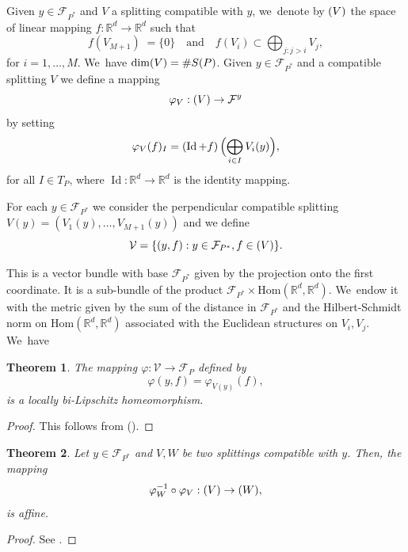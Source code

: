 \documentclass[JEP,XML,SOM,Unicode,NoEqCountersInSection,published]{cedram}
\newcommand{\quand}{\quad\text{and}\quad}
\newcommand{\NoChangel}[1]{%
\expandafter\let\csname old\string#1\endcsname=#1
\let#1=\relax
\newcommand{#1}{\mathop{\mathcode`l="716C\csname old\string#1\endcsname\mathcode`l="7160}\displaylimits}%
}
\newtheorem{theorem}{Theorem}[section]
\newcommand{\R}{\mathbb{R}}
\newcommand{\F}{\mathcal{F}}
\newcommand{\V}{\mathcal{V}}
\DeclareMathOperator{\id}{Id}
\DeclareMathOperator{\nil}{Nil}\NoChangel{\nil}
\begin{document}
Given \(y \in \F_{P^\ast} \) and \(V\) a splitting compatible with \(y\), we~denote by \(\nil (V)\) the space of linear mapping \(f:\R^d \to \R^d\) such that\vspace*{-3pt}
\begin{equation}\label{defineVequation}
f\left(V_{M+1}\right) \;= \{0\} \quand f\left(V_i\right) \subset \bigoplus_{j : j>i } V_j,
\end{equation}
for \(i = 1,\ldots,M\). We~have \(\dim \nil(V) = \# S(P)\). Given \(y\in \F_{P^\ast} \) and a compatible splitting \(V\) we define a mapping\vspace*{-3pt}
\[
\varphi_V: \nil(V) \to \F^{y}
\]
by setting\vspace*{-3pt}
\begin{equation}\label{lineartoconfiguration}
\varphi_{V}(f)_I = \left(\id + f\right)\Bigl(\bigoplus_{i \in I}V_i(y)\Bigr),
\end{equation}
for all \(I \in T_P\), where \(\id:\R^d \to \R^d\) is the identity mapping.

For each \(y \in \F_{P^\ast} \) we consider the perpendicular compatible splitting \(V(y) = (V_1(y),\ldots, V_{M+1}(y))\) and we define
\begin{equation}\label{vectorbundleequation}
\V = \lbrace (y,f): y \in \F_{P^\ast}, f \in \nil(V)\rbrace.
\end{equation}

This is a vector bundle with base \(\F_{P^\ast} \) given by the projection onto the first coordinate. It is a sub-bundle of the product \(\F_{P^\ast} \times \text{Hom}(\R^d,\R^d)\). We~endow it with the metric given by the sum of the distance in \(\F_{P^\ast} \) and the Hilbert-Schmidt norm on \(\text{Hom}(\R^d,\R^d)\) associated with the Euclidean structures on \(V_i, V_j\). We~have

\begin{theorem}\label{fiberbundle}The mapping \(\varphi :\V \to \F_{P} \) defined by
\[
\varphi (y,f) = \varphi_{V(y)}(f),
\]
is a locally bi-Lipschitz homeomorphism. \end{theorem}
\begin{proof}This follows from \cite[Th.\,2.4 \& its proof]{LL23} (\cite[\S4]{LL23}). \end{proof}

\begin{theorem}\label{changeofsplitting} Let \(y\in \F_{P^\ast} \) and \(V,W\) be two splittings compatible with \(y\). Then, the mapping
\[
\varphi_W^{-1}\circ \varphi_{V}:\nil(V) \to \nil (W),
\]
is affine.
\end{theorem}
\begin{proof} See \cite[Lem.\,5.8]{LL23}.
\end{proof}
\end{document}

